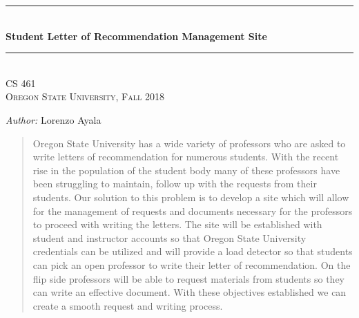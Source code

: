 \documentclass[onecolumn, draftclsnofoot,10pt, compsoc]{IEEEtran}
\begin{document}
\begin{titlepage}
    \newcommand{\HRule}{\rule{\linewidth}{0.5mm}}
    \center 
    \HRule \\[0.4cm]
    { \Large \bfseries Student Letter of Recommendation Management Site}\\[0.4cm] 
    \HRule \\[0.5cm]
    \center 
    \textsc{\Large CS 461}\\[0.5cm] 
    \textsc{\Large Oregon State University, Fall 2018}\\[0.5cm] 
    \begin{minipage}{0.4\textwidth}
        \begin{center} \large
        \emph{Author:} Lorenzo Ayala
        \end{center}
    \end{minipage}
    \vspace{2cm}
    \begin{abstract}
    Oregon State University has a wide variety of professors who are asked to write letters of recommendation for numerous students. With the recent rise in the population of the student body many of these professors have been struggling to maintain, follow up with the requests from their students. Our solution to this problem is to develop a site which will allow for the management of requests and documents necessary for the professors to proceed with writing the letters. The site will be established with student and instructor accounts so that Oregon State University credentials can be utilized and will provide a load detector so that students can pick an open professor to write their letter of recommendation. On the flip side professors will be able to request materials from students so they can write an effective document. With these objectives established we can create a smooth request and writing process. 
    \end{abstract}
    \vfill %
\end{titlepage}
\newpage
{}

\center
\end{document}
